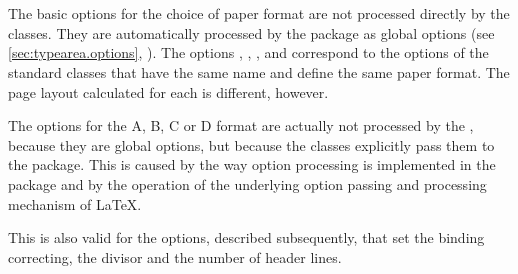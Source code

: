 \begin{Declaration}
   \\
   \\
   \\
   \\
   \\
   \\
   \\
\end{Declaration}%
%
%
%
%
%
%
%
%
The basic options for the choice of paper format are not processed directly by
the classes. They are automatically processed by the 
package as global options (see \autoref{sec:typearea.options},
). The options ,
, ,  and
 correspond to the options of the standard classes that
have the same name and define the same paper format.  The page layout
calculated for each is different, however.
%
%
%
%
%
%
%
%

\begin{Explain}
  The options for the A, B, C or D format are actually not processed
  by the , because they are global options, but
  because the \KOMAScript{} classes explicitly pass them to the
   package. This is caused by the way option
  processing is implemented in the  package and by
  the operation of the underlying option passing and processing
  mechanism of \LaTeX.

  This is also valid for the options, described subsequently, that set
  the binding correcting, the divisor and the number of header lines.
\end{Explain}


